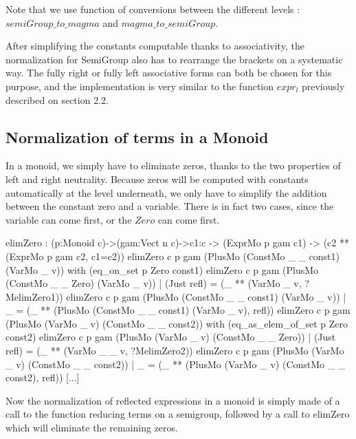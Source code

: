 \documentclass{sigplanconf}
\begin{document}
Note that we use function of conversions between the different levels : $semiGroup\_to\_magma$ and $magma\_to\_semiGroup$.

After simplifying the constants computable thanks to associativity, the normalization for SemiGroup also has to rearrange the brackets on a systematic way. The fully right or fully left associative forms can both be chosen for this purpose, and the implementation is very similar to the function $expr_l$ previously described on section 2.2.

	\subsection {Normalization of terms in a Monoid}

In a monoid, we simply have to eliminate zeros, thanks to the two properties of left and right neutrality. Because zeros will be computed with constants automatically at the level underneath, we only have to simplify the addition between the constant zero and a variable. There is in fact two cases, since the variable can come first, or the $Zero$ can come first.

\begin{code}[caption=Eliminating zeros in a Monoid, captionpos=b, label=lst1:haskell2]
elimZero : (p:Monoid c)->(gam:Vect n c)->{c1:c} 
            -> (ExprMo p gam c1) 
            -> (c2 ** (ExprMo p gam c2, c1=c2))
elimZero c p gam 
 (PlusMo (ConstMo _ _ const1) (VarMo _ v)) 
        with (eq_on_set p Zero const1)
   elimZero c p gam (PlusMo (ConstMo _ _ Zero) 
                 (VarMo _ v)) | (Just refl) 
          = (_ ** (VarMo _ v, ?MelimZero1))
   elimZero c p gam (PlusMo (ConstMo _ _ const1) 
                 (VarMo _ v)) | _ 
          = (_ ** (PlusMo (ConstMo _ _ const1) 
               (VarMo _ v), refl)) 
elimZero c p gam 
 (PlusMo (VarMo _ v) (ConstMo _ _ const2)) 
      with (eq_as_elem_of_set p Zero const2) 
   elimZero c p gam (PlusMo (VarMo _ v) 
            (ConstMo _ _ Zero)) | (Just refl) 
          = (_ ** (VarMo _ _ v, ?MelimZero2))
   elimZero c p gam (PlusMo (VarMo _ v) 
            (ConstMo _ _ const2)) | _ 
          = (_ ** (PlusMo (VarMo _ v) 
                 (ConstMo _ _ const2), refl))
[...]
\end{code}

Now the normalization of reflected expressions in a monoid is simply made of a call to the function reducing terms on a semigroup, followed by a call to elimZero which will eliminate the remaining zeros. 
\end{document}
